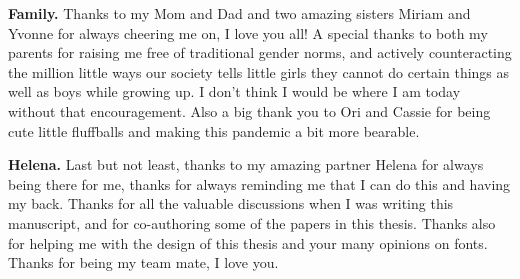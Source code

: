 \textbf{Family.} Thanks to my Mom and Dad and two amazing sisters Miriam and Yvonne for always cheering me on, I love you all! A special thanks to both my parents for raising me free of traditional gender norms, and actively counteracting the million little ways our society tells little girls they cannot do certain things as well as boys while growing up. I don't think I would be where I am today without that encouragement. Also a big thank you to Ori and Cassie for being cute little fluffballs and making this pandemic a bit more bearable.

\textbf{Helena.} Last but not least, thanks to my amazing partner Helena for always being there for me, thanks for always reminding me that I can do this and having my back. Thanks for all the valuable discussions when I was writing this manuscript, and for co-authoring some of the papers in this thesis. Thanks also for helping me with the design of this thesis and your many opinions on fonts. Thanks for being my team mate, I love you.

